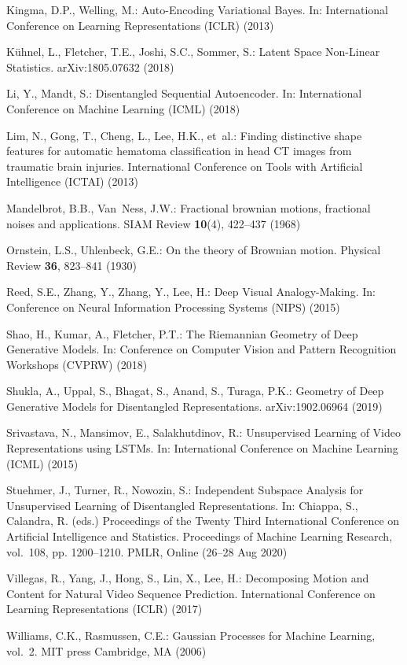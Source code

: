 \documentclass[runningheads]{llncs}
\begin{document}
\begin{thebibliography}{10}
	Kingma, D.P., Welling, M.: Auto-{E}ncoding {V}ariational {B}ayes. In:
	International Conference on Learning Representations (ICLR) (2013)
	
	K{\"u}hnel, L., Fletcher, T.E., Joshi, S.C., Sommer, S.: Latent {S}pace
	{N}on-{L}inear {S}tatistics. arXiv:1805.07632  (2018)
	
	Li, Y., Mandt, S.: Disentangled {S}equential {A}utoencoder. In: International
	Conference on Machine Learning (ICML) (2018)
	
	Lim, N., Gong, T., Cheng, L., Lee, H.K., et~al.: Finding distinctive shape
	features for automatic hematoma classification in head {C}{T} images from
	traumatic brain injuries. International Conference on Tools with Artificial
	Intelligence (ICTAI)  (2013)
	
	Mandelbrot, B.B., Van~Ness, J.W.: Fractional brownian motions, fractional
	noises and applications. SIAM Review  \textbf{10}(4),  422--437 (1968)
	
	Ornstein, L.S., Uhlenbeck, G.E.: On the theory of {B}rownian motion. Physical
	Review  \textbf{36},  823--841 (1930)
	
	Reed, S.E., Zhang, Y., Zhang, Y., Lee, H.: Deep {V}isual {A}nalogy-{M}aking.
	In: Conference on Neural Information Processing Systems (NIPS) (2015)
	
	Shao, H., Kumar, A., Fletcher, P.T.: The {R}iemannian {G}eometry of {D}eep
	{G}enerative {M}odels. In: Conference on Computer Vision and Pattern
	Recognition Workshops (CVPRW) (2018)
	
	Shukla, A., Uppal, S., Bhagat, S., Anand, S., Turaga, P.K.: Geometry of {D}eep
	{G}enerative {M}odels for {D}isentangled {R}epresentations. arXiv:1902.06964
	(2019)
	
	Srivastava, N., Mansimov, E., Salakhutdinov, R.: Unsupervised {L}earning of
	{V}ideo {R}epresentations using {LSTM}s. In: International Conference on
	Machine Learning (ICML) (2015)
	
	Stuehmer, J., Turner, R., Nowozin, S.: Independent {S}ubspace {A}nalysis for
	{U}nsupervised {L}earning of {D}isentangled {R}epresentations. In: Chiappa,
	S., Calandra, R. (eds.) Proceedings of the Twenty Third International
	Conference on Artificial Intelligence and Statistics. Proceedings of Machine
	Learning Research, vol.~108, pp. 1200--1210. PMLR, Online (26--28 Aug 2020)
	
	Villegas, R., Yang, J., Hong, S., Lin, X., Lee, H.: Decomposing {M}otion and
	{C}ontent for {N}atural {V}ideo {S}equence {P}rediction. International
	Conference on Learning Representations (ICLR)  (2017)
	
	Williams, C.K., Rasmussen, C.E.: Gaussian {P}rocesses for {M}achine {L}earning,
	vol.~2. MIT press Cambridge, MA (2006)
	
\end{thebibliography}
\end{document}
